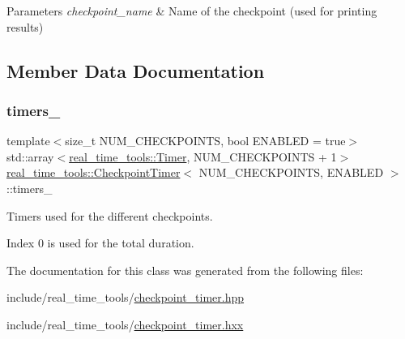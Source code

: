 \begin{DoxyParams}{Parameters}
{\em checkpoint\+\_\+name} & Name of the checkpoint (used for printing results) \\
\hline
\end{DoxyParams}


\subsection{Member Data Documentation}
\mbox{\label{classreal__time__tools_1_1CheckpointTimer_a0abbead69aaf780b649f6af01f50cc62}} 
\subsubsection{\texorpdfstring{timers\+\_\+}{timers\_}}
{\footnotesize\ttfamily template$<$size\+\_\+t N\+U\+M\+\_\+\+C\+H\+E\+C\+K\+P\+O\+I\+N\+TS, bool E\+N\+A\+B\+L\+ED = true$>$ \\
std\+::array$<$\hyperlink{classreal__time__tools_1_1Timer}{real\+\_\+time\+\_\+tools\+::\+Timer}, N\+U\+M\+\_\+\+C\+H\+E\+C\+K\+P\+O\+I\+N\+TS + 1$>$ \hyperlink{classreal__time__tools_1_1CheckpointTimer}{real\+\_\+time\+\_\+tools\+::\+Checkpoint\+Timer}$<$ N\+U\+M\+\_\+\+C\+H\+E\+C\+K\+P\+O\+I\+N\+TS, E\+N\+A\+B\+L\+ED $>$\+::timers\+\_\+\hspace{0.3cm}{\ttfamily [private]}}



Timers used for the different checkpoints. 

Index 0 is used for the total duration. 

The documentation for this class was generated from the following files\+:\begin{DoxyCompactItemize}
\item 
include/real\+\_\+time\+\_\+tools/\hyperlink{checkpoint__timer_8hpp}{checkpoint\+\_\+timer.\+hpp}\item 
include/real\+\_\+time\+\_\+tools/\hyperlink{checkpoint__timer_8hxx}{checkpoint\+\_\+timer.\+hxx}\end{DoxyCompactItemize}
